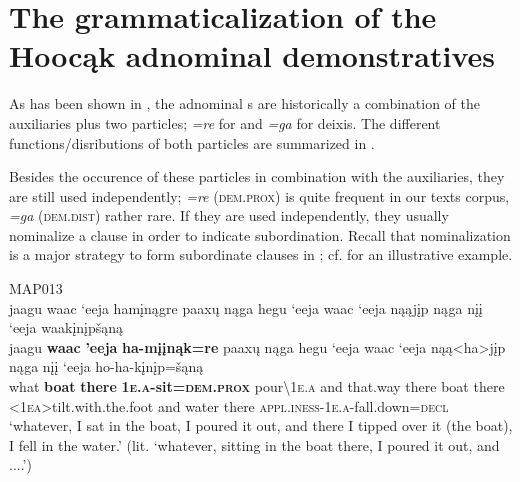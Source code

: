 \documentclass[output=paper]{langsci/langscibook}
\begin{document}
\section{The grammaticalization of the Hoocąk adnominal demonstratives}\label{sec:helmbrecht:4}

As has been shown in , the adnominal s are historically a combination of the  auxiliaries plus two  particles; \textit{=re} for  and \textit{=ga} for  deixis. The different functions\slash disributions of both  particles are summarized in .  



Besides the occurence of these particles in combination with the  auxiliaries, they are still used independently; \textit{=re} (\textsc{dem}.\textsc{prox}) is quite frequent in our texts corpus, \textit{=ga} (\textsc{dem}.\textsc{dist}) rather rare. If they are used independently, they usually nominalize a clause in order to indicate subordination. Recall that nominalization is a major strategy to form subordinate clauses in ; cf.  for an illustrative example.

\ea \label{ex:helmbrecht:17}
  MAP013\\
\glll jaagu waac `eeja hamįnągre paaxų nąga hegu `eeja waac `eeja nąąjįp nąga nįį `eeja waakįnįpšąną\\
    jaagu \textbf{waac}  \textbf{'eeja} \textbf{ha-mįįnąk=re}             paaxų      nąga  hegu       `eeja waac  `eeja  nąą<ha>jįp                           nąga  nįį  `eeja ho-ha-kįnįp=šąną\\
    what  \textbf{boat}   \textbf{there}  \textbf{\textsc{1e.a}}\textbf{-sit=}\textbf{\textsc{dem}.\textsc{prox}}   pour{\textbackslash}\textsc{1e.a}  and    that.way  there boat  there  <\textsc{1ea}>tilt.with.the.foot   and  water  there \textsc{appl}.\textsc{iness}-\textsc{1e.a}-fall.down=\textsc{decl}\\
\glt `whatever, I sat in the boat, I poured it out, and there I tipped over it (the boat), I fell in the water.' (lit. `whatever, sitting in the boat there, I poured it out, and ....')
\z
\end{document}

